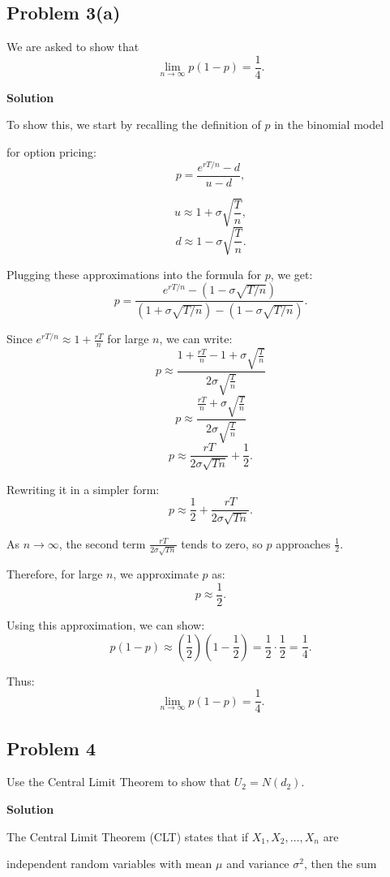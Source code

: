 \documentclass{article}
\begin{document}
\subsection*{Problem 3(a)}

We are asked to show that
\[
\lim_{n \to \infty} p(1 - p) = \frac{1}{4}.
\]

\textbf{Solution}

To show this, we start by recalling the definition of \( p \) in the binomial model 

for option pricing:
\[
p = \frac{e^{rT/n} - d}{u - d},
\]

\[
u \approx 1 + \sigma\sqrt{\frac{T}{n}},
\]
\[
d \approx 1 - \sigma\sqrt{\frac{T}{n}}.
\]

Plugging these approximations into the formula for \( p \), we get:
\[
p = \frac{e^{rT/n} - (1 - \sigma\sqrt{T/n})}{(1 + \sigma\sqrt{T/n}) - (1 - \sigma\sqrt{T/n})}.
\]

Since \( e^{rT/n} \approx 1 + \frac{rT}{n} \) for large \( n \), we can write:
\[
p \approx \frac{1 + \frac{rT}{n} - 1 + \sigma\sqrt{\frac{T}{n}}}{2\sigma\sqrt{\frac{T}{n}}}
\]
\[
p \approx \frac{\frac{rT}{n} + \sigma\sqrt{\frac{T}{n}}}{2\sigma\sqrt{\frac{T}{n}}}
\]
\[
p \approx \frac{rT}{2\sigma\sqrt{Tn}} + \frac{1}{2}.
\]

Rewriting it in a simpler form:
\[
p \approx \frac{1}{2} + \frac{rT}{2\sigma\sqrt{Tn}}.
\]

As \( n \to \infty \), the second term \( \frac{rT}{2\sigma\sqrt{Tn}} \) tends to zero, so \( p \) approaches \( \frac{1}{2} \).

Therefore, for large \( n \), we approximate \( p \) as:
\[
p \approx \frac{1}{2}.
\]

Using this approximation, we can show:
\[
p(1 - p) \approx \left(\frac{1}{2}\right) \left(1 - \frac{1}{2}\right) = \frac{1}{2} \cdot \frac{1}{2} = \frac{1}{4}.
\]

Thus:
\[
\lim_{n \to \infty} p(1 - p) = \frac{1}{4}.
\]

\subsection*{Problem 4}
Use the Central Limit Theorem to show that $U_2 = N(d_2)$.

\textbf{Solution}

The Central Limit Theorem (CLT) states that if \(X_1, X_2, \ldots, X_n\) are 

independent random variables with mean \(\mu\) and variance \(\sigma^2\), then the sum 
\end{document}
